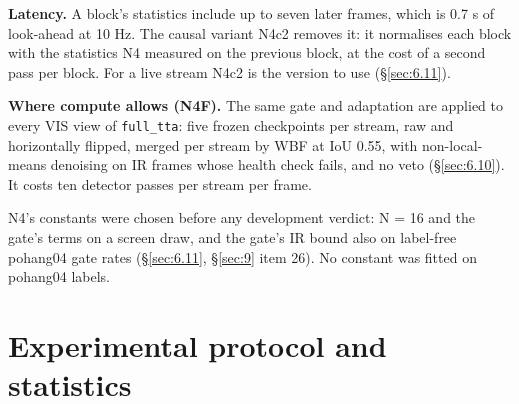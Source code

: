 \documentclass[10pt]{article}
\begin{document}
\textbf{Latency.} A block's statistics include up to seven later frames, which is 0.7 s of look-ahead at 10 Hz. The causal variant N4c2 removes it: it normalises each block with the statistics N4 measured on the previous block, at the cost of a second pass per block. For a live stream N4c2 is the version to use (\S\ref{sec:6.11}).

\textbf{Where compute allows (N4F).} The same gate and adaptation are applied to every VIS view of \texttt{full\_\allowbreak{}tta}: five frozen checkpoints per stream, raw and horizontally flipped, merged per stream by WBF at IoU 0.55, with non-local-means denoising on IR frames whose health check fails, and no veto (\S\ref{sec:6.10}). It costs ten detector passes per stream per frame.

N4's constants were chosen before any development verdict: N = 16 and the gate's terms on a screen draw, and the gate's IR bound also on label-free pohang04 gate rates (\S\ref{sec:6.11}, \S\ref{sec:9} item 26). No constant was fitted on pohang04 labels.

\section{Experimental protocol and statistics}\label{sec:5}
\end{document}
